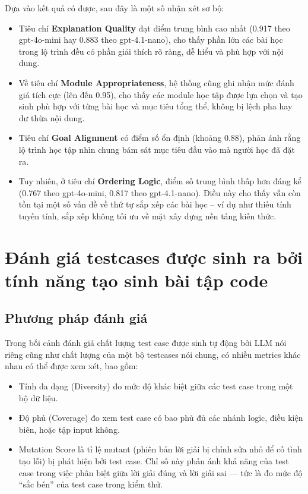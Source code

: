 Dựa vào kết quả có được, sau đây là một số nhận xét sơ bộ:
\begin{itemize}
    \item Tiêu chí \textbf{Explanation Quality} đạt điểm trung bình cao nhất (0.917 theo gpt-4o-mini hay 0.883 theo gpt-4.1-nano), cho thấy phần lớn các bài học trong lộ trình đều có phần giải thích rõ ràng, dễ hiểu và phù hợp với nội dung.

    \item Về tiêu chí \textbf{Module Appropriateness}, hệ thống cũng ghi nhận mức đánh giá tích cực (lên đến 0.95), cho thấy các module học tập được lựa chọn và tạo sinh phù hợp với từng bài học và mục tiêu tổng thể, không bị lệch pha hay dư thừa nội dung.

    \item Tiêu chí \textbf{Goal Alignment} có điểm số ổn định (khoảng 0.88), phản ánh rằng lộ trình học tập nhìn chung bám sát mục tiêu đầu vào mà người học đã đặt ra.

    \item Tuy nhiên, ở tiêu chí \textbf{Ordering Logic}, điểm số trung bình thấp hơn đáng kể (0.767 theo gpt-4o-mini, 0.817 theo gpt-4.1-nano). Điều này cho thấy vẫn còn tồn tại một số vấn đề về thứ tự sắp xếp các bài học – ví dụ như thiếu tính tuyến tính, sắp xếp không tối ưu về mặt xây dựng nền tảng kiến thức.
\end{itemize}

\section{Đánh giá testcases được sinh ra bởi tính năng tạo sinh bài tập code}
\subsection{Phương pháp đánh giá}
Trong bối cảnh đánh giá chất lượng test case được sinh tự động bởi LLM nói riêng cũng như chất lượng của một bộ testcases nói chung, có nhiều metrics khác nhau có thể được xem xét, bao gồm:
\begin{itemize}
    \item Tính đa dạng (Diversity) đo mức độ khác biệt giữa các test case trong một bộ dữ liệu.
    \item Độ phủ (Coverage) đo xem test case có bao phủ đủ các nhánh logic, điều kiện biên, hoặc tập input không.
    \item Mutation Score là tỉ lệ mutant (phiên bản lời giải bị chỉnh sửa nhỏ để cố tình tạo lỗi) bị phát hiện bởi test case. Chỉ số này phản ánh khả năng của test case trong việc phân biệt giữa lời giải đúng và lời giải sai — tức là đo mức độ “sắc bén” của test case trong kiểm thử.

\end{itemize}

